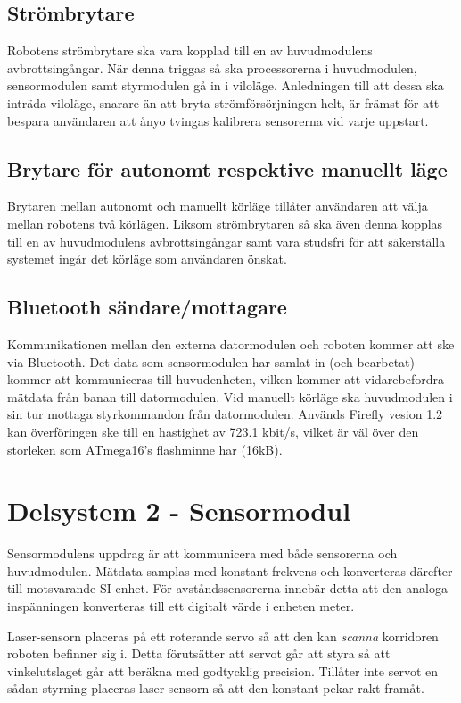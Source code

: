 \documentclass[11pt]{article}
\begin{document}
\begin{flushleft}
\subsection{Strömbrytare}
Robotens strömbrytare ska vara kopplad till en av huvudmodulens avbrottsingångar. När denna triggas så ska processorerna i huvudmodulen, sensormodulen samt styrmodulen gå in i viloläge. Anledningen till att dessa ska inträda viloläge, snarare än att bryta strömförsörjningen helt, är främst för att bespara användaren att ånyo tvingas kalibrera sensorerna vid varje uppstart.
\subsection{Brytare för autonomt respektive manuellt läge}
Brytaren mellan autonomt och manuellt körläge tillåter användaren att välja mellan robotens två körlägen. Liksom strömbrytaren så ska även denna kopplas till en av huvudmodulens avbrottsingångar samt vara studsfri för att säkerställa systemet ingår det körläge som användaren önskat.
\subsection{Bluetooth\textsuperscript{\circledR} sändare/mottagare} \label{bluetooth} 
Kommunikationen mellan den externa datormodulen och roboten kommer att ske via Bluetooth\textsuperscript{\circledR}. Det data som sensormodulen har samlat in (och bearbetat) kommer att kommuniceras till huvudenheten, vilken kommer att vidarebefordra mätdata från banan till datormodulen. Vid manuellt körläge ska huvudmodulen i sin tur mottaga styrkommandon från datormodulen. Används Firefly vesion 1.2 kan överföringen ske till en hastighet av 723.1 kbit/s, vilket är väl över den storleken som ATmega16's flashminne har (16kB).


\pagebreak
\section{Delsystem 2 - Sensormodul}
\label{sec:sensormodul}
Sensormodulens uppdrag är att kommunicera med både sensorerna och huvudmodulen. Mätdata samplas med konstant frekvens och konverteras därefter till motsvarande SI-enhet. För avståndssensorerna innebär detta att den analoga inspänningen konverteras till ett digitalt värde i enheten meter.

Laser-sensorn placeras på ett roterande servo så att den kan \emph{scanna} korridoren roboten befinner sig i. Detta förutsätter att servot går att styra så att vinkelutslaget går att beräkna med godtycklig precision. Tillåter inte servot en sådan styrning placeras laser-sensorn så att den konstant pekar rakt framåt.


\end{flushleft}
\end{document}
